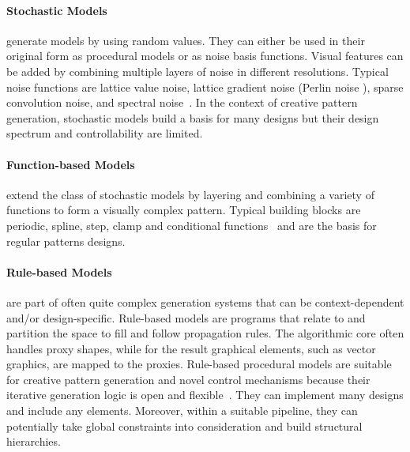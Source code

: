 \paragraph*{Stochastic Models} generate models by using random values. They can either be used in their original form as procedural models or as noise basis functions. Visual features can be added by combining multiple layers of noise in different resolutions. Typical noise functions are lattice value noise, lattice gradient noise (\eg Perlin noise \cite{perlin_1985_ais}), sparse convolution noise, and spectral noise~\cite{ebert_2003_tmp,lagae_2010_sap}. 
In the context of creative pattern generation, stochastic models build a basis for many designs but their design spectrum and controllability are limited.

\paragraph*{Function-based Models} extend the class of stochastic models by layering and combining a variety of functions to form a visually complex pattern. Typical building blocks are periodic, spline, step, clamp and conditional functions~\cite{ebert_2003_tmp} and are the basis for regular patterns designs. 


\paragraph*{Rule-based Models} are part of often quite complex generation systems that can be context-dependent and/or design-specific. Rule-based models are programs that relate to and partition the space to fill and follow propagation rules. The algorithmic core often handles proxy shapes, while for the result graphical elements, such as vector graphics, are mapped to the proxies. Rule-based procedural models are suitable for creative pattern generation and novel control mechanisms because their iterative generation logic is open and flexible~\cite{wong_1998_cgf, mech_2012_tdf}. They can implement many designs and include any elements. Moreover, within a suitable pipeline, they can potentially take global constraints into consideration and build structural hierarchies.


